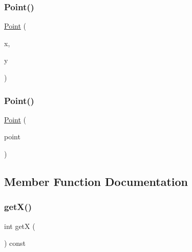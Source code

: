 \mbox{\label{classPoint_a6773b78ca9523d4d482ac886b41a1bfc}} 
\subsubsection{\texorpdfstring{Point()}{Point()}\hspace{0.1cm}{\footnotesize\ttfamily [2/3]}}
{\footnotesize\ttfamily \mbox{\hyperlink{classPoint}{Point}} (\begin{DoxyParamCaption}\item[{int}]{x,  }\item[{int}]{y }\end{DoxyParamCaption})}

\mbox{\label{classPoint_af5c561032606b32861e8ebdc949397ad}} 
\subsubsection{\texorpdfstring{Point()}{Point()}\hspace{0.1cm}{\footnotesize\ttfamily [3/3]}}
{\footnotesize\ttfamily \mbox{\hyperlink{classPoint}{Point}} (\begin{DoxyParamCaption}\item[{const \mbox{\hyperlink{classGPoint}{G\+Point}} \&}]{point }\end{DoxyParamCaption})}



\subsection{Member Function Documentation}
\mbox{\label{classPoint_ae6902baa2934561358fc7f8f3852d4f6}} 
\subsubsection{\texorpdfstring{get\+X()}{getX()}}
{\footnotesize\ttfamily int getX (\begin{DoxyParamCaption}{ }\end{DoxyParamCaption}) const}

\mbox{\label{classPoint_afaf0a0403410a186997c1477e8bf6897}} 
